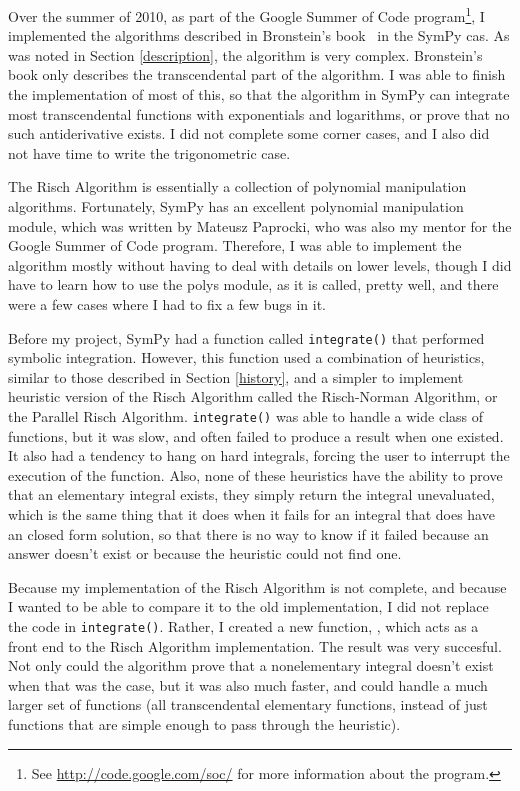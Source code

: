 Over the summer of 2010, as part of the Google Summer of Code
program\footnote{ See \url{http://code.google.com/soc/} for more
information about the program.}, I implemented the algorithms described
in Bronstein's book~\cite{bronstein2005symbolic} in the SymPy \gls{cas}.
As was noted in Section \ref{description}, the algorithm is very
complex. Bronstein's book only describes the \gls{transcendental} part
of the algorithm. I was able to finish the implementation of most of
this, so that the algorithm in SymPy can integrate most
\gls{transcendental} functions with exponentials and logarithms, or
prove that no such antiderivative exists.  I did not complete some
corner cases, and I also did not have time to write the trigonometric
case.

The Risch Algorithm is essentially a collection of polynomial
manipulation algorithms.  Fortunately, SymPy has an excellent polynomial
manipulation module, which was written by Mateusz Paprocki, who was also
my mentor for the Google Summer of Code program.  Therefore, I was able
to implement the algorithm mostly without having to deal with details on
lower levels, though I did have to learn how to use the polys module, as
it is called, pretty well, and there were a few cases where I had to fix
a few bugs in it.

Before my project, SymPy had a function called \texttt{integrate()} that
performed symbolic integration.  However, this function used a
combination of heuristics, similar to those described in Section
\ref{history}, and a simpler to implement heuristic version of the Risch
Algorithm called the Risch-Norman Algorithm, or the Parallel Risch
Algorithm.  \texttt{integrate()} was able to handle a wide class of
functions, but it was slow, and often failed to produce a result when
one existed.  It also had a tendency to hang on hard integrals, forcing
the user to interrupt the execution of the function.  Also, none of
these heuristics have the ability to prove that an \gls{elementary}
integral exists, they simply return the integral unevaluated, which is
the same thing that it does when it fails for an integral that does have
an closed form solution, so that there is no way to know if it failed
because an answer doesn't exist or because the heuristic could not find
one.

Because my implementation of the Risch Algorithm is not complete, and
because I wanted to be able to compare it to the old implementation, I
did not replace the code in \texttt{integrate()}.  Rather, I created a
new function, \rischintegrate{}, which acts as a front end to the Risch
Algorithm implementation.  The result was very succesful.  Not only
could the algorithm prove that a nonelementary integral doesn't exist
when that was the case, but it was also much faster, and could handle a
much larger set of functions (all \gls{transcendental} \gls{elementary}
functions, instead of just functions that are simple enough to pass
through the heuristic).

